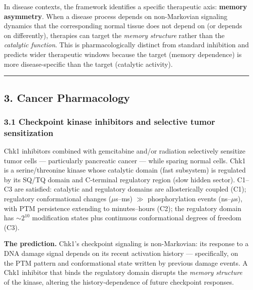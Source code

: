 \documentclass[
  11pt,
]{article}
\begin{document}
In disease contexts, the framework identifies a specific therapeutic
axis: \textbf{memory asymmetry}. When a disease process depends on
non-Markovian signaling dynamics that the corresponding normal tissue
does not depend on (or depends on differently), therapies can target the
\emph{memory structure} rather than the \emph{catalytic function}. This
is pharmacologically distinct from standard inhibition and predicts
wider therapeutic windows because the target (memory dependence) is more
disease-specific than the target (catalytic activity).

\begin{center}\rule{0.5\linewidth}{0.5pt}\end{center}

\hypertarget{cancer-pharmacology}{%
\subsection{3. Cancer Pharmacology}\label{cancer-pharmacology}}

\hypertarget{checkpoint-kinase-inhibitors-and-selective-tumor-sensitization}{%
\subsubsection{3.1 Checkpoint kinase inhibitors and selective tumor
sensitization}\label{checkpoint-kinase-inhibitors-and-selective-tumor-sensitization}}

Chk1 inhibitors combined with gemcitabine and/or radiation selectively
sensitize tumor cells --- particularly pancreatic cancer --- while
sparing normal cells. Chk1 is a serine/threonine kinase whose catalytic
domain (fast subsystem) is regulated by its SQ/TQ domain and C-terminal
regulatory region (slow hidden sector). C1--C3 are satisfied: catalytic
and regulatory domains are allosterically coupled (C1); regulatory
conformational changes (\(\mu\)s--ms) \(\gg\) phosphorylation events
(ns--\(\mu\)s), with PTM persistence extending to minutes--hours (C2);
the regulatory domain has \(\sim 2^{10}\) modification states plus
continuous conformational degrees of freedom (C3).

\textbf{The prediction.} Chk1's checkpoint signaling is non-Markovian:
its response to a DNA damage signal depends on its recent activation
history --- specifically, on the PTM pattern and conformational state
written by previous damage events. A Chk1 inhibitor that binds the
regulatory domain disrupts the \emph{memory structure} of the kinase,
altering the history-dependence of future checkpoint responses.
\end{document}
